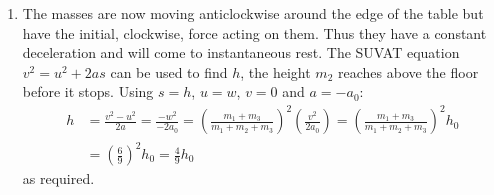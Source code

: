 \begin{problem}[A1969AMIIQ2a]
{\begin{enumerate}
\begin{enumerate}
		\item The impulse on $m_{2}$ is simply the change in its momentum as it is lifted from the floor. It starts stationary on the floor and is then moving upwards at a speed $w$:
\begin{align*} I &= (m_{2})(w) - (m_{2})(0) = m_{2}w = \frac{m_{2} \left(m_{1} + m_{3} \right)}{m_{1} + m_{2} + m_{3}} v = \frac{m_{2} \sqrt{2a_{0}h_{0}} \left(m_{1} + m_{3} \right)}{m_{1} + m_{2} + m_{3}} \\ &= \frac{(3)(1.4)(6)}{9} \textrm{ kg ms}^{-1} = \frac{14}{5} \textrm{ kg ms}^{-1} = 2.8 \textrm{ kg ms}^{-1}\end{align*}

The loss in kinetic energy (KE) as $m_{2}$ starts moving is given by the total KE before, minus the KE after:
\begin{align*} \textrm{KE Loss} &= \left( \frac{1}{2}m_{1}v^{2} + \frac{1}{2}m_{3}v^{2} \right) - \left( \frac{1}{2}m_{1}w^{2} + \frac{1}{2}m_{2}w^{2} + \frac{1}{2}m_{3}w^{2} \right) \\ &= \frac{1}{2} \left( (m_{1} + m_{3})v^{2} - (m_{1} + m_{2} + m_{3})w^{2} \right) \\ &= \frac{1}{2}v^{2} \left( (m_{1} + m_{3}) - \frac{(m_{1} + m_{3})^{2}}{m_{1} + m_{2} + m_{3}} \right) \\ &= \frac{1}{2}(1.4)^{2} \left( 6 - \frac{36}{9} \right) \textrm{ J} \\ &= \frac{49}{25} \textrm{ J} = 1.96 \textrm{ J}\end{align*}
	\end{enumerate}
	\item The masses are now moving anticlockwise around the edge of the table but have the initial, clockwise, force acting on them. Thus they have a constant deceleration and will come to instantaneous rest. The SUVAT equation $v^{2} = u^{2} + 2as$ can be used to find $h$, the height $m_{2}$ reaches above the floor before it stops. Using $s = h$, $u = w$, $v = 0$ and $a = -a_{0}$:
\begin{align*} h &= \frac{v^{2} - u^{2}}{2a} = \frac{-w^{2}}{-2a_{0}} = \left( \frac{m_{1} + m_{3}}{m_{1} + m_{2} + m_{3}} \right)^{2} \left( \frac{v^{2}}{2a_{0}} \right) =  \left( \frac{m_{1} + m_{3}}{m_{1} + m_{2} + m_{3}} \right)^{2} h_{0} \\ &= \left( \frac{6}{9} \right)^{2} h_{0} = \frac{4}{9} h_{0}\end{align*} as required.
\end{enumerate}}
\end{problem}